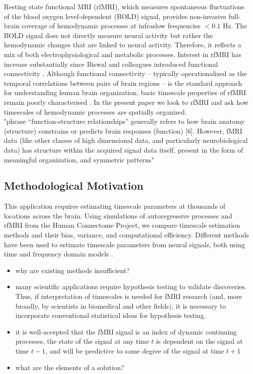 \documentclass[latex/main.tex]{subfiles}
\begin{document}
Resting state functional MRI (rfMRI), which measures spontaneous fluctuations of the blood oxygen level-dependent (BOLD) signal, provides non-invasive full-brain coverage of hemodynamic processes at infraslow frequencies $<0.1$ Hz. The BOLD signal does not directly measure neural activity but rather the hemodynamic changes that are linked to neural activity. Therefore, it reflects a mix of both electrophysiological and metabolic processes. Interest in rfMRI has increase substantially since Biswal and colleagues introduced functional connectivity \cite{biswal_functional_1995}. Although functional connectivity -- typically operationalized as the temporal correlations between pairs of brain regions -- is the standard approach for understanding human brain organization, basic timescale properties of rfMRI remain poorly characterised \cite{shinn_functional_2023}. In the present paper we look to rfMRI and ask how timescales of hemodynamic processes are spatially organized.\\

"phrase “function-structure relationships” generally refers to how brain anatomy (structure) constrains or predicts brain responses (function) [6]. However, fMRI data (like other classes of high dimensional data, and particularly neurobiological data) has structure within the acquired signal data itself, present in the form of meaningful organization, and symmetric patterns"

\subsection{Methodological Motivation}
This application requires estimating timescale parameters at thousands of locations across the brain. Using simulations of autoregressive processes and rfMRI from the Human Connectome Project, we compare timescale estimation methods and their bias, variance, and computational efficiency. Different methods have been used to estimate timescale parameters from neural signals, both using time and frequency domain models \cite{gao_neuronal_2020, raut_hierarchical_2020}. 

\begin{itemize}
    \item why are existing methods insufficient?
    \item many scientific applications require hypothesis testing to validate discoveries. Thus, if interpretation of timescales is needed for fMRI research (and, more broadly, by scientists in biomedical and other fields), it is necessary to incorporate conventional statistical ideas for hypothesis testing.

    \item it is well-accepted that the fMRI signal is an index of dynamic continuing processes, the state of the signal at any time $t$ is dependent on the signal at time $t-1$, and will be predictive to some degree of the signal at time $t+1$
    \item what are the elements of a solution?
\end{itemize}
\end{document}
